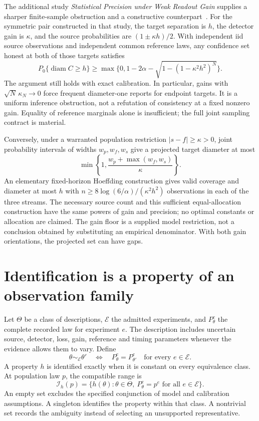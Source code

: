 The additional study \emph{Statistical Precision under Weak Readout Gain} supplies a sharper finite-sample obstruction and a constructive counterpart~\cite{justusWeakGain}. For the symmetric pair constructed in that study, the target separation is $h$, the detector gain is $\kappa$, and the source probabilities are $(1\pm\kappa h)/2$. With independent iid source observations and independent common reference laws, any confidence set honest at both of those targets satisfies
\[
 P_0\{\operatorname{diam}C\ge h\}\ge
 \max\{0,1-2\alpha-\sqrt{1-(1-\kappa^2h^2)^N}\}.
\]
The argument still holds with exact calibration. In particular, gains with $\sqrt N\,\kappa_N\to0$ force frequent diameter-one reports for endpoint targets. It is a uniform inference obstruction, not a refutation of consistency at a fixed nonzero gain. Equality of reference marginals alone is insufficient; the full joint sampling contract is material.

Conversely, under a warranted population restriction $|s-f|\ge\kappa>0$, joint probability intervals of widths $w_p,w_f,w_s$ give a projected target diameter at most
\[
 \min\left\{1,\frac{w_p+\max(w_f,w_s)}{\kappa}\right\}.
\]
An elementary fixed-horizon Hoeffding construction gives valid coverage and diameter at most $h$ with $n\ge8\log(6/\alpha)/(\kappa^2h^2)$ observations in each of the three streams. The necessary source count and this sufficient equal-allocation construction have the same powers of gain and precision; no optimal constants or allocation are claimed. The gain floor is a supplied model restriction, not a conclusion obtained by substituting an empirical denominator. With both gain orientations, the projected set can have gaps.

\section{Identification is a property of an observation family}
\label{col:identification}

Let $\Theta$ be a class of descriptions, $\mathcal E$ the admitted experiments, and $P_\theta^e$ the complete recorded law for experiment $e$. The description includes uncertain source, detector, loss, gain, reference and timing parameters whenever the evidence allows them to vary. Define
\[
 \theta\sim_{\mathcal E}\theta'
 \quad\Longleftrightarrow\quad
 P_\theta^e=P_{\theta'}^e\quad\text{for every }e\in\mathcal E.
\]
A property $h$ is identified exactly when it is constant on every equivalence class. At population law $p$, the compatible range is
\[
 \mathcal I_h(p)=
 \{h(\theta):\theta\in\Theta,\ P_\theta^e=p^e\text{ for all }e\in\mathcal E\}.
\]
An empty set excludes the specified conjunction of model and calibration assumptions. A singleton identifies the property within that class. A nontrivial set records the ambiguity instead of selecting an unsupported representative.

